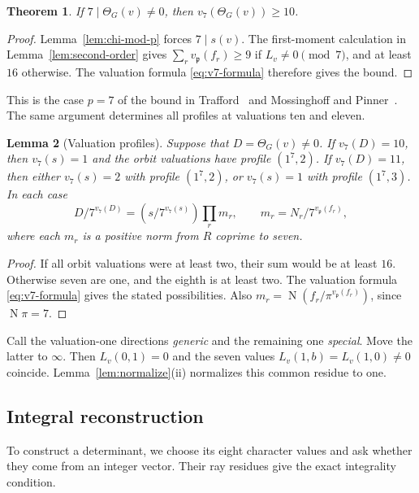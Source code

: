 \documentclass[11pt]{amsart}
\theoremstyle{plain}
\newtheorem{theorem}{Theorem}[section]
\newtheorem{lemma}[theorem]{Lemma}
\theoremstyle{definition}
\numberwithin{equation}{section}
\DeclareMathOperator{\Nm}{N}
\newcommand{\GG}{G}
\newcommand{\pp}{\mathfrak p}
\begin{document}
\begin{theorem}\label{thm:noncoprime}
If $7\mid\Theta_\GG(v)\ne0$, then $v_7(\Theta_\GG(v))\ge10$.
\end{theorem}
\begin{proof}
Lemma~\ref{lem:chi-mod-p} forces $7\mid s(v)$.
The first-moment calculation in Lemma~\ref{lem:second-order}
gives $\sum_rv_\pp(f_r)\ge9$ if $L_v\ne0\pmod7$, and at least
$16$ otherwise. The valuation formula \eqref{eq:v7-formula}
therefore gives the bound.
\end{proof}
This is the case $p=7$ of the bound in
Trafford~\cite[Lemma~13]{Trafford1992} and
Mossinghoff and Pinner~\cite[Theorem~2.1]{MossinghoffPinnerHeisenberg}.
The same argument determines all profiles at valuations ten and eleven.

\begin{lemma}[Valuation profiles]\label{lem:pinning}
Suppose that $D=\Theta_\GG(v)\ne0$. If $v_7(D)=10$, then $v_7(s)=1$
and the orbit valuations have profile $(1^7,2)$. If $v_7(D)=11$,
then either $v_7(s)=2$ with profile $(1^7,2)$, or $v_7(s)=1$
with profile $(1^7,3)$. In each case
\[
 D/7^{v_7(D)}=(s/7^{v_7(s)})\prod_rm_r,\qquad
 m_r=N_r/7^{v_\pp(f_r)},
\]
where each $m_r$ is a positive norm from $R$ coprime to seven.
\end{lemma}
\begin{proof}
If all orbit valuations were at least two, their sum would be at
least $16$. Otherwise seven are one, and the eighth is at least two.
The valuation formula \eqref{eq:v7-formula} gives the stated possibilities.
Also $m_r=\Nm(f_r/\pi^{v_\pp(f_r)})$, since $\Nm\pi=7$.
\end{proof}
Call the valuation-one directions \emph{generic} and the remaining
one \emph{special}. Move the latter to $\infty$. Then $L_v(0,1)=0$
and the seven values $L_v(1,b)=L_v(1,0)\ne0$ coincide.
Lemma~\ref{lem:normalize}(ii) normalizes this common residue to one.


\subsection{Integral reconstruction}\label{sec:method}

To construct a determinant, we choose its eight character values
and ask whether they come from an integer vector.
Their ray residues give the exact integrality condition.
\end{document}
